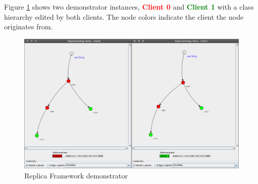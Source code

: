 Figure \ref{fig_demo} shows two demonstrator instances,
\textcolor{red}{\textbf{Client 0}} and \textcolor{green}{\textbf{Client 1}}
with a class hierarchy edited by both clients. The node colors indicate
the client the node originates from.
\begin{figure}[h]
        \caption{Replica Framework demonstrator}
        \begin{center}
                \includegraphics[width=\textwidth]{BilderFrontendImpl/demonstrator.png}
        \end{center}
        \label{fig_demo}
\end{figure}

